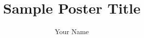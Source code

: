 \documentclass{tikzposter}
\begin{document}
\title{Sample Poster Title}
\author{Your Name}
\maketitle
{}
\begin{columns}
\end{columns}
\begin{columns}
\end{columns}
\end{document}
